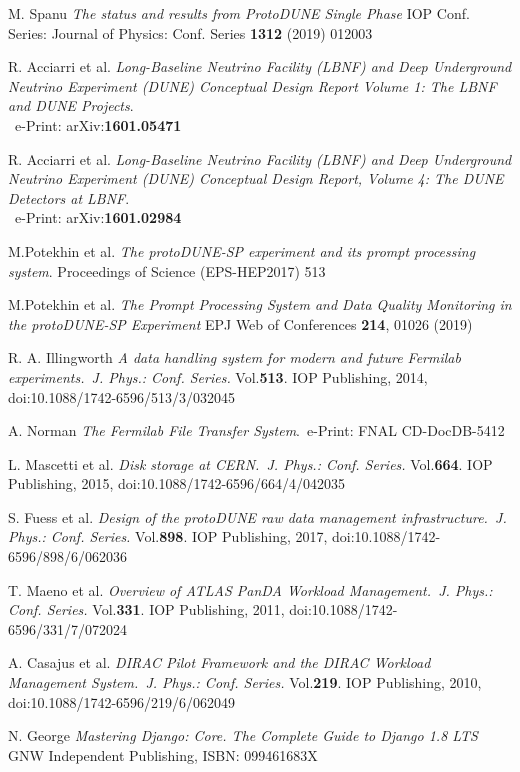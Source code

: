 \documentclass{webofc}
\begin{document}
\begin{thebibliography}{99}

M. Spanu
\emph{The status and results from ProtoDUNE Single Phase}
IOP Conf. Series: Journal of Physics: Conf. Series \textbf{1312} (2019) 012003

R. Acciarri et al.
\emph{Long-Baseline Neutrino Facility (LBNF) and Deep Underground Neutrino Experiment (DUNE) Conceptual Design Report Volume 1: The LBNF and DUNE Projects}.\\ ~e-Print: arXiv:\textbf{1601.05471}


R. Acciarri et al.
\emph{Long-Baseline Neutrino Facility (LBNF) and Deep Underground Neutrino Experiment (DUNE) Conceptual Design Report, Volume 4: The DUNE Detectors at LBNF}.\\~e-Print: arXiv:\textbf{1601.02984}

 M.Potekhin et al. \emph{The protoDUNE-SP experiment and its prompt
processing system}. Proceedings of Science (EPS-HEP2017) 513

 M.Potekhin et al. \emph{The Prompt Processing System
and Data Quality Monitoring in the protoDUNE-SP Experiment}
EPJ Web of Conferences \textbf{214}, 01026 (2019)

R. A. Illingworth \emph{A data handling system for modern and future Fermilab experiments.~J. Phys.: Conf. Series.} Vol.\textbf{513}. IOP Publishing, 2014,
doi:10.1088/1742-6596/513/3/032045

A. Norman \emph{The Fermilab File Transfer System}.~e-Print: FNAL CD-DocDB-5412

 L. Mascetti et al. \emph{Disk storage at CERN.~J. Phys.: Conf. Series.} Vol.\textbf{664}. IOP Publishing, 2015,
doi:10.1088/1742-6596/664/4/042035

S. Fuess et al. \emph{Design of the protoDUNE raw data management
infrastructure.~J. Phys.: Conf. Series.} Vol.\textbf{898}. IOP Publishing, 2017,
doi:10.1088/1742-6596/898/6/062036


T. Maeno et al. \emph{Overview of ATLAS PanDA Workload Management.~J. Phys.: Conf. Series.} Vol.\textbf{331}. IOP Publishing, 2011,
doi:10.1088/1742-6596/331/7/072024



A. Casajus et al.  \emph{DIRAC Pilot Framework and the DIRAC
Workload Management System.~J. Phys.: Conf. Series.} Vol.\textbf{219}. IOP Publishing, 2010,
doi:10.1088/1742-6596/219/6/062049

N. George \emph{Mastering Django: Core. The Complete Guide to Django 1.8 LTS}~ GNW Independent Publishing, ISBN: 099461683X


\end{thebibliography}
\end{document}
